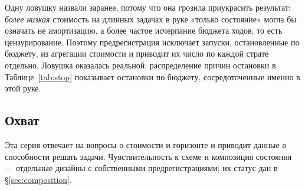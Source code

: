 Одну ловушку назвали заранее, потому что она грозила приукрасить результат:
\emph{более низкая} стоимость на длинных задачах в руке «только состояние»
могла бы означать не амортизацию, а более частое исчерпание бюджета ходов,
то есть цензурирование. Поэтому предрегистрация исключает запуски,
остановленные по бюджету, из агрегации стоимости и приводит их число по
каждой страте отдельно. Ловушка оказалась реальной: распределение причин
остановки в Таблице~\ref{tab:stop} показывает остановки по бюджету,
сосредоточенные именно в этой руке.

\subsection{Охват}

Эта серия отвечает на вопросы о стоимости и горизонте и приводит данные о
способности решать задачи. Чувствительность к схеме и композиция состояния —
отдельные дизайны с собственными предрегистрациями; их статус дан в
\S\ref{sec:composition}.
